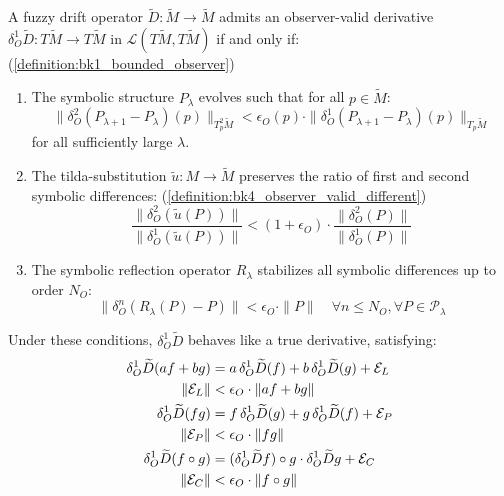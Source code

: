 \begin{theorem} \label{theorem:bk4_existence_observer_valid_derivatives}
A fuzzy drift operator $\widetilde{D}: \widetilde{M} \to \widetilde{M}$ admits an observer-valid derivative $\delta^1_O \widetilde{D}: T\widetilde{M} \to T\widetilde{M}$ in $\mathcal{L}(T\widetilde{M}, T\widetilde{M})$ if and only if: (\ref{definition:bk1_bounded_observer})
\begin{enumerate}
\item The symbolic structure $P_\lambda$ evolves such that for all $p \in \widetilde{M}$:
\[
\|\delta^2_O(P_{\lambda+1} - P_\lambda)(p)\|_{T^2_p\widetilde{M}} < \epsilon_O(p) \cdot \|\delta^1_O(P_{\lambda+1} - P_\lambda)(p)\|_{T_p\widetilde{M}}
\]
for all sufficiently large $\lambda$.
\item The tilda-substitution $\tilde{u}: M \to \widetilde{M}$ preserves the ratio of first and second symbolic differences: (\ref{definition:bk4_observer_valid_different})
\[
\frac{\|\delta^2_O(\tilde{u}(P))\|}{\|\delta^1_O(\tilde{u}(P))\|} < (1+\epsilon_O) \cdot \frac{\|\delta^2_O(P)\|}{\|\delta^1_O(P)\|}
\]
\item The symbolic reflection operator $R_\lambda$ stabilizes all symbolic differences up to order $N_O$:
\[
\|\delta^n_O(R_\lambda(P) - P)\| < \epsilon_O \cdot \|P\| \quad \forall n \leq N_O, \forall P \in \mathcal{P}_\lambda
\]
\end{enumerate}
Under these conditions, $\delta^1_O \widetilde{D}$ behaves like a true derivative, satisfying:
\begin{align}
\delta^1_O \widetilde{D}(af + bg) &= a\, \delta^1_O \widetilde{D}(f) + b\, \delta^1_O \widetilde{D}(g) + \mathcal{E}_L \\
\| \mathcal{E}_L \| &< \epsilon_O \cdot \| af + bg \| \notag \\
\delta^1_O \widetilde{D}(fg) &= f\, \delta^1_O \widetilde{D}(g) + g\, \delta^1_O \widetilde{D}(f) + \mathcal{E}_P \\
\| \mathcal{E}_P \| &< \epsilon_O \cdot \| fg \| \notag \\
\delta^1_O \widetilde{D}(f \circ g) &= (\delta^1_O \widetilde{D}f) \circ g \cdot \delta^1_O \widetilde{D}g + \mathcal{E}_C \\
\| \mathcal{E}_C \| &< \epsilon_O \cdot \| f \circ g \| \notag
\end{align}
\end{theorem}

